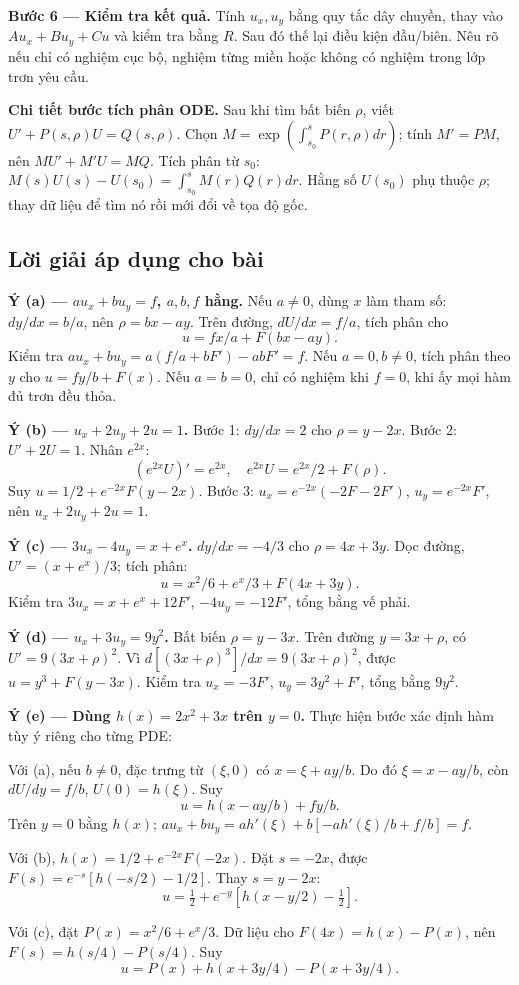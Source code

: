 \documentclass[10pt,a4paper]{article}
\begin{document}
\textbf{Bước 6 — Kiểm tra kết quả.} Tính $u_x,u_y$ bằng quy tắc dây chuyền, thay vào $Au_x+Bu_y+Cu$ và kiểm tra bằng $R$. Sau đó thế lại điều kiện đầu/biên. Nêu rõ nếu chỉ có nghiệm cục bộ, nghiệm từng miền hoặc không có nghiệm trong lớp trơn yêu cầu.

\textbf{Chi tiết bước tích phân ODE.} Sau khi tìm bất biến $\rho$, viết $U'+P(s,\rho)U=Q(s,\rho)$. Chọn $M=\exp(\int_{s_0}^{s}P(r,\rho)dr)$; tính $M'=PM$, nên $MU'+M'U=MQ$. Tích phân từ $s_0$: $M(s)U(s)-U(s_0)=\int_{s_0}^sM(r)Q(r)dr$. Hằng số $U(s_0)$ phụ thuộc $\rho$; thay dữ liệu để tìm nó rồi mới đổi về tọa độ gốc.
\subsection*{Lời giải áp dụng cho bài}
\textbf{Ý (a) — $au_x+bu_y=f$, $a,b,f$ hằng.} Nếu $a\ne0$, dùng $x$ làm tham số: $dy/dx=b/a$, nên $\rho=bx-ay$. Trên đường, $dU/dx=f/a$, tích phân cho
\[u=fx/a+F(bx-ay).\]
Kiểm tra $au_x+bu_y=a(f/a+bF')-abF'=f$. Nếu $a=0,b\ne0$, tích phân theo $y$ cho $u=fy/b+F(x)$. Nếu $a=b=0$, chỉ có nghiệm khi $f=0$, khi ấy mọi hàm đủ trơn đều thỏa.

\textbf{Ý (b) — $u_x+2u_y+2u=1$.} Bước 1: $dy/dx=2$ cho $\rho=y-2x$. Bước 2: $U'+2U=1$. Nhân $e^{2x}$:
\[(e^{2x}U)'=e^{2x},\quad e^{2x}U=e^{2x}/2+F(\rho).\]
Suy $u=1/2+e^{-2x}F(y-2x)$. Bước 3: $u_x=e^{-2x}(-2F-2F')$, $u_y=e^{-2x}F'$, nên $u_x+2u_y+2u=1$.

\textbf{Ý (c) — $3u_x-4u_y=x+e^x$.} $dy/dx=-4/3$ cho $\rho=4x+3y$. Dọc đường, $U'=(x+e^x)/3$; tích phân:
\[u=x^2/6+e^x/3+F(4x+3y).\]
Kiểm tra $3u_x=x+e^x+12F'$, $-4u_y=-12F'$, tổng bằng vế phải.

\textbf{Ý (d) — $u_x+3u_y=9y^2$.} Bất biến $\rho=y-3x$. Trên đường $y=3x+\rho$, có $U'=9(3x+\rho)^2$. Vì $d[(3x+\rho)^3]/dx=9(3x+\rho)^2$, được $u=y^3+F(y-3x)$. Kiểm tra $u_x=-3F'$, $u_y=3y^2+F'$, tổng bằng $9y^2$.

\textbf{Ý (e) — Dùng $h(x)=2x^2+3x$ trên $y=0$.} Thực hiện bước xác định hàm tùy ý riêng cho từng PDE:

Với (a), nếu $b\ne0$, đặc trưng từ $(\xi,0)$ có $x=\xi+ay/b$. Do đó $\xi=x-ay/b$, còn $dU/dy=f/b$, $U(0)=h(\xi)$. Suy
\[u=h(x-ay/b)+fy/b.\]
Trên $y=0$ bằng $h(x)$; $au_x+bu_y=ah'(\xi)+b[-ah'(\xi)/b+f/b]=f$.

Với (b), $h(x)=1/2+e^{-2x}F(-2x)$. Đặt $s=-2x$, được $F(s)=e^{-s}[h(-s/2)-1/2]$. Thay $s=y-2x$:
\[u=\tfrac12+e^{-y}[h(x-y/2)-\tfrac12].\]

Với (c), đặt $P(x)=x^2/6+e^x/3$. Dữ liệu cho $F(4x)=h(x)-P(x)$, nên $F(s)=h(s/4)-P(s/4)$. Suy
\[u=P(x)+h(x+3y/4)-P(x+3y/4).\]
\end{document}
